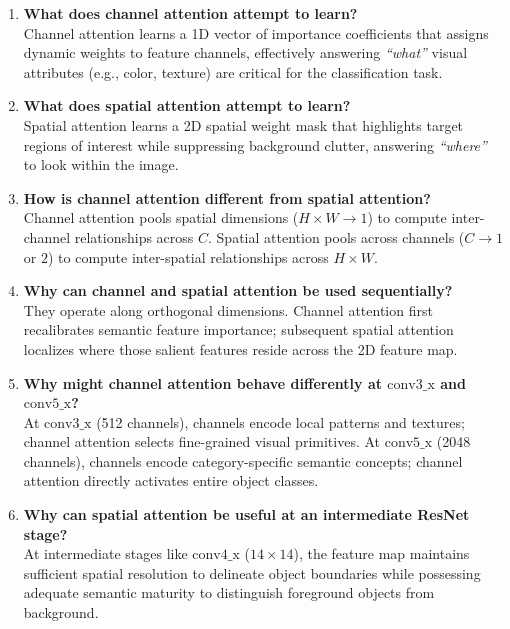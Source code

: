 \documentclass[11pt,a4paper]{article}
\begin{document}
\begin{enumerate}[label=\textbf{\arabic*.}]
    \item \textbf{What does channel attention attempt to learn?} \\
    Channel attention learns a 1D vector of importance coefficients that assigns dynamic weights to feature channels, effectively answering \textit{``what''} visual attributes (e.g., color, texture) are critical for the classification task.

    \item \textbf{What does spatial attention attempt to learn?} \\
    Spatial attention learns a 2D spatial weight mask that highlights target regions of interest while suppressing background clutter, answering \textit{``where''} to look within the image.

    \item \textbf{How is channel attention different from spatial attention?} \\
    Channel attention pools spatial dimensions ($H \times W \to 1$) to compute inter-channel relationships across $C$. Spatial attention pools across channels ($C \to 1$ or $2$) to compute inter-spatial relationships across $H \times W$.

    \item \textbf{Why can channel and spatial attention be used sequentially?} \\
    They operate along orthogonal dimensions. Channel attention first recalibrates semantic feature importance; subsequent spatial attention localizes where those salient features reside across the 2D feature map.

    \item \textbf{Why might channel attention behave differently at $\text{conv3\_x}$ and $\text{conv5\_x}$?} \\
    At $\text{conv3\_x}$ (512 channels), channels encode local patterns and textures; channel attention selects fine-grained visual primitives. At $\text{conv5\_x}$ (2048 channels), channels encode category-specific semantic concepts; channel attention directly activates entire object classes.

    \item \textbf{Why can spatial attention be useful at an intermediate ResNet stage?} \\
    At intermediate stages like $\text{conv4\_x}$ ($14 \times 14$), the feature map maintains sufficient spatial resolution to delineate object boundaries while possessing adequate semantic maturity to distinguish foreground objects from background.


\end{enumerate}
\end{document}
